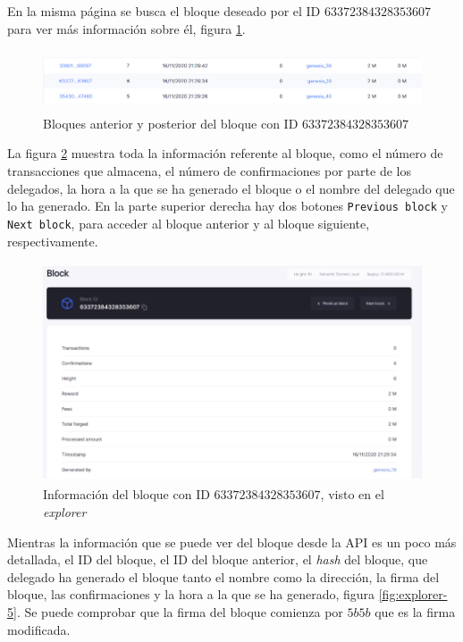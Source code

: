 \newpage
En la misma página se busca el bloque deseado por el ID $63372384328353607$ para ver más información sobre él, figura \ref{fig:explorer-3}.\\

\begin{figure}[H]
	\centering
	\includegraphics[width=12.5cm,height=1.8cm]{figuras/explorer_3.png}
	\caption{Bloques anterior y posterior del bloque con ID $63372384328353607$}
	\label{fig:explorer-3}
\end{figure}

La figura \ref{fig:explorer-4} muestra toda la información referente al bloque, como el número de transacciones que almacena, el número de confirmaciones por parte de los delegados, la hora a la que se ha generado el bloque o el nombre del delegado que lo ha generado. En la parte superior derecha hay dos botones \texttt{Previous block} y \texttt{Next block}, para acceder al bloque anterior y al bloque siguiente, respectivamente.\\

\begin{figure}[H]
	\centering
	\includegraphics[width=12cm,height=6.5cm]{figuras/explorer_4.png}
	\caption{Información del bloque con ID $63372384328353607$, visto en el \textit{explorer}}
	\label{fig:explorer-4}
\end{figure}

Mientras la información que se puede ver del bloque desde la API es un poco más detallada, el ID del bloque, el ID del bloque anterior, el \textit{hash} del bloque, que delegado ha generado el bloque tanto el nombre como la dirección, la firma del bloque, las confirmaciones y la hora a la que se ha generado, figura \ref{fig:explorer-5}. Se puede comprobar que la firma del bloque comienza por $5b5b$ que es la firma modificada.\\

